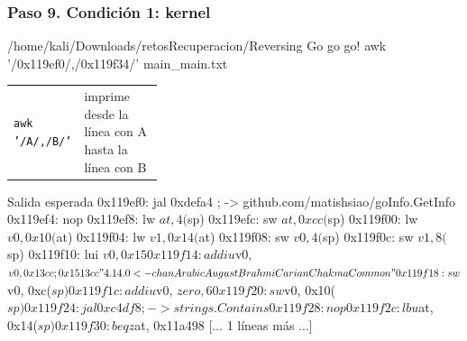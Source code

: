 \documentclass[11pt,a4paper]{article}
\begin{document}
\subsubsection*{Paso 9. Condición 1: kernel}
\begin{comando}{/home/kali/Downloads/retosRecuperacion/Reversing Go go go!}
awk '/0x119ef0/,/0x119f34/' main_main.txt
\end{comando}
\begin{tcolorbox}[enhanced, breakable, colback=white, colframe=gray!40, boxrule=0.3pt, arc=1pt, left=4pt, right=4pt, top=2pt, bottom=2pt, fonttitle=\sffamily\scriptsize\bfseries, coltitle=black!75, colbacktitle=gray!8, title={Qué hace cada parte}, attach title to upper, before skip=2pt, after skip=4pt, fontupper=\small]
\par{\renewcommand{\arraystretch}{1.12}\begin{tabularx}{\linewidth}{@{}>{\raggedright\arraybackslash}p{0.33\linewidth}>{\raggedright\arraybackslash}X@{}}
\texttt{awk '/\allowbreak{}A/\allowbreak{},\allowbreak{}/\allowbreak{}B/\allowbreak{}'} & imprime desde la línea con A hasta la línea con B \\
\end{tabularx}}
\end{tcolorbox}
\begin{salidan}{Salida esperada}
0x119ef0: jal      0xdefa4  ; -> github.com/matishsiao/goInfo.GetInfo
0x119ef4: nop      
0x119ef8: lw       $at, 4($sp)
0x119efc: sw       $at, 0xcc($sp)
0x119f00: lw       $v0, 0x10($at)
0x119f04: lw       $v1, 0x14($at)
0x119f08: sw       $v0, 4($sp)
0x119f0c: sw       $v1, 8($sp)
0x119f10: lui      $v0, 0x15
0x119f14: addiu    $v0, $v0, 0x13cc  ; 0x1513cc "4.14.0<-chanArabicAugustBrahmiCarianChakmaCommon"
0x119f18: sw       $v0, 0xc($sp)
0x119f1c: addiu    $v0, $zero, 6
0x119f20: sw       $v0, 0x10($sp)
0x119f24: jal      0xc4df8  ; -> strings.Contains
0x119f28: nop      
0x119f2c: lbu      $at, 0x14($sp)
0x119f30: beqz     $at, 0x11a498
[... 1 líneas más ...]
\end{salidan}
\end{document}
